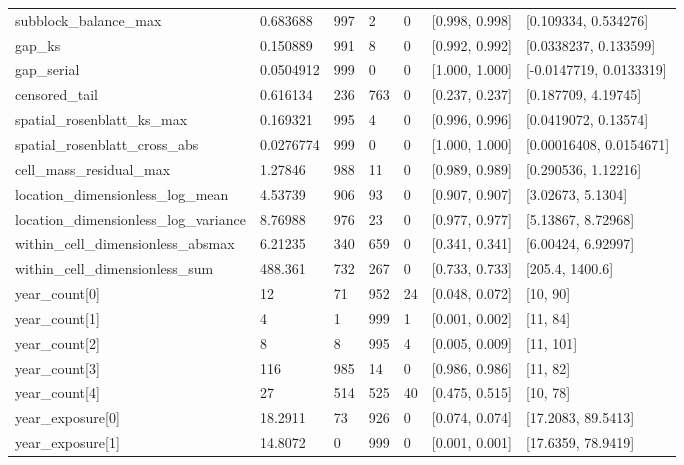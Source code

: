 \begin{longtable}
{}subblock\_\allowbreak{}balance\_\allowbreak{}max & 0.683688 & 997 & 2 & 0 & [0.998, 0.998] & [0.109334, 0.534276] \\
{}gap\_\allowbreak{}ks & 0.150889 & 991 & 8 & 0 & [0.992, 0.992] & [0.0338237, 0.133599] \\
{}gap\_\allowbreak{}serial & 0.0504912 & 999 & 0 & 0 & [1.000, 1.000] & [-0.0147719, 0.0133319] \\
{}censored\_\allowbreak{}tail & 0.616134 & 236 & 763 & 0 & [0.237, 0.237] & [0.187709, 4.19745] \\
{}spatial\_\allowbreak{}rosenblatt\_\allowbreak{}ks\_\allowbreak{}max & 0.169321 & 995 & 4 & 0 & [0.996, 0.996] & [0.0419072, 0.13574] \\
{}spatial\_\allowbreak{}rosenblatt\_\allowbreak{}cross\_\allowbreak{}abs & 0.0276774 & 999 & 0 & 0 & [1.000, 1.000] & [0.00016408, 0.0154671] \\
{}cell\_\allowbreak{}mass\_\allowbreak{}residual\_\allowbreak{}max & 1.27846 & 988 & 11 & 0 & [0.989, 0.989] & [0.290536, 1.12216] \\
{}location\_\allowbreak{}dimensionless\_\allowbreak{}log\_\allowbreak{}mean & 4.53739 & 906 & 93 & 0 & [0.907, 0.907] & [3.02673, 5.1304] \\
{}location\_\allowbreak{}dimensionless\_\allowbreak{}log\_\allowbreak{}variance & 8.76988 & 976 & 23 & 0 & [0.977, 0.977] & [5.13867, 8.72968] \\
{}within\_\allowbreak{}cell\_\allowbreak{}dimensionless\_\allowbreak{}absmax & 6.21235 & 340 & 659 & 0 & [0.341, 0.341] & [6.00424, 6.92997] \\
{}within\_\allowbreak{}cell\_\allowbreak{}dimensionless\_\allowbreak{}sum & 488.361 & 732 & 267 & 0 & [0.733, 0.733] & [205.4, 1400.6] \\
{}year\_\allowbreak{}count[0] & 12 & 71 & 952 & 24 & [0.048, 0.072] & [10, 90] \\
{}year\_\allowbreak{}count[1] & 4 & 1 & 999 & 1 & [0.001, 0.002] & [11, 84] \\
{}year\_\allowbreak{}count[2] & 8 & 8 & 995 & 4 & [0.005, 0.009] & [11, 101] \\
{}year\_\allowbreak{}count[3] & 116 & 985 & 14 & 0 & [0.986, 0.986] & [11, 82] \\
{}year\_\allowbreak{}count[4] & 27 & 514 & 525 & 40 & [0.475, 0.515] & [10, 78] \\
{}year\_\allowbreak{}exposure[0] & 18.2911 & 73 & 926 & 0 & [0.074, 0.074] & [17.2083, 89.5413] \\
{}year\_\allowbreak{}exposure[1] & 14.8072 & 0 & 999 & 0 & [0.001, 0.001] & [17.6359, 78.9419] \\

\end{longtable}
